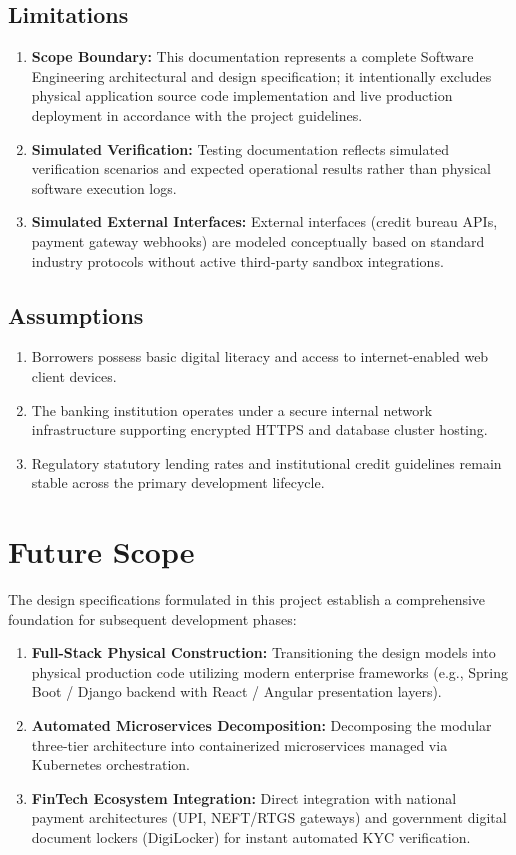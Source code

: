\subsection{Limitations}

\begin{enumerate}
  \item \textbf{Scope Boundary:} This documentation represents a complete Software Engineering architectural and design specification; it intentionally excludes physical application source code implementation and live production deployment in accordance with the project guidelines.
  \item \textbf{Simulated Verification:} Testing documentation reflects simulated verification scenarios and expected operational results rather than physical software execution logs.
  \item \textbf{Simulated External Interfaces:} External interfaces (credit bureau APIs, payment gateway webhooks) are modeled conceptually based on standard industry protocols without active third-party sandbox integrations.
\end{enumerate}

\subsection{Assumptions}

\begin{enumerate}
  \item Borrowers possess basic digital literacy and access to internet-enabled web client devices.
  \item The banking institution operates under a secure internal network infrastructure supporting encrypted HTTPS and database cluster hosting.
  \item Regulatory statutory lending rates and institutional credit guidelines remain stable across the primary development lifecycle.
\end{enumerate}

\section{Future Scope}

The design specifications formulated in this project establish a comprehensive foundation for subsequent development phases:

\begin{enumerate}
  \item \textbf{Full-Stack Physical Construction:} Transitioning the design models into physical production code utilizing modern enterprise frameworks (e.g., Spring Boot / Django backend with React / Angular presentation layers).
  \item \textbf{Automated Microservices Decomposition:} Decomposing the modular three-tier architecture into containerized microservices managed via Kubernetes orchestration.
  \item \textbf{FinTech Ecosystem Integration:} Direct integration with national payment architectures (UPI, NEFT/RTGS gateways) and government digital document lockers (DigiLocker) for instant automated KYC verification.
\end{enumerate}

